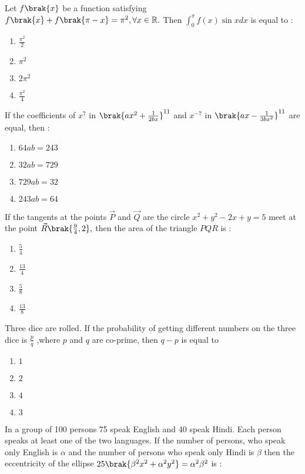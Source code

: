 \item Let $f\brak{x}$ be a function satisfying $f\brak{x}+f\brak{\pi -x}=\pi ^2,\forall x \in \mathbb{R}.$ Then $\int_0^{\pi} f(x) \sin x dx$ is equal to :   \hfill{}
        \begin{enumerate}
        \item $\frac{\pi ^2}{2}$
        \item $\pi ^2$
        \item $2\pi ^2$
        \item $\frac{\pi ^2}{4}$
    \end{enumerate}
\item If the coefficients of $x^7$ in $\brak{ ax^2 + \frac{1}{2bx}}^{11}$ and $x^{-7}$ in $\brak{ax - \frac{1}{3bx^2}}^{11}$ are equal, then :    \hfill{}
\begin{enumerate}
        \item $64 ab = 243$
        \item $32 ab = 729$
        \item $729 ab = 32$
        \item $243 ab = 64$
    \end{enumerate}
\item If the tangents at the points $\vec{P}$ and $\vec{Q}$ are the circle $ x^2 + y^2 -2x + y = 5 $ meet at the point $\vec{R} \brak{ \frac{9}{4},2} ,$ then the area of the triangle $PQR$ is : \hfill{}
\begin{enumerate}                  
        \item $\frac{5}{4}$    
        \item $\frac{13}{4}$
        \item $\frac{5}{8}$
        \item $\frac{13}{8}$
\end{enumerate}
\item Three dice are rolled. If the probability of getting different numbers on the three dice is
$\frac{p}{q}$ ,where $p$ and $q$ are co-prime, then $q-p$ is equal to \hfill{}
        \begin{enumerate}
        \item $1$ 
        \item $2$
        \item $4$ 
        \item $3$
    \end{enumerate}
\item In a group of 100 persons 75 speak English and 40 speak Hindi. Each person speaks at least one of the two languages. If the number of persons, who speak only English is $\alpha$ and the number of persons who speak only Hindi is $\beta $ then the eccentricity of the ellipse $25 \brak{\beta ^2 x^2 +\alpha ^2 y^2} = \alpha ^2 \beta ^2$ is : \hfill{}
